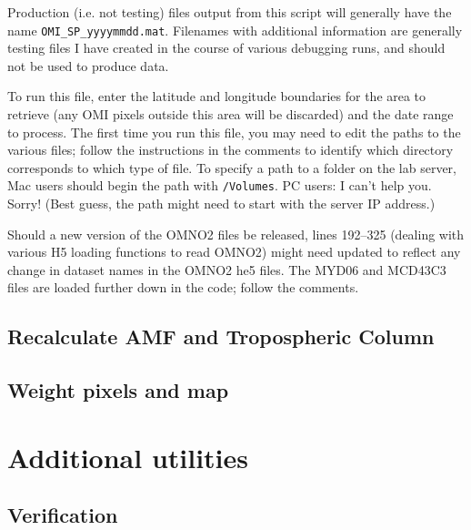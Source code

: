 \documentclass[12pt]{article}
\begin{document}
	Production (i.e. not testing) files output from this script will generally have the name {\lstinline[breaklines=true]|OMI_SP_yyyymmdd.mat|}.  Filenames with additional information are generally testing files I have created in the course of various debugging runs, and should not be used to produce  data.
	
	To run this file, enter the latitude and longitude boundaries for the area to retrieve (any OMI pixels outside this area will be discarded) and the date range to process.  The first time you run this file, you may need to edit the paths to the various files; follow the instructions in the comments to identify which directory corresponds to which type of file.  To specify a path to a folder on the lab server, Mac users should begin the path with {\lstinline[breaklines=true]|/Volumes|}.  PC users: I can't help you. Sorry! (Best guess, the path might need to start with the server IP address.)
	
	Should a new version of the OMNO2 files be released, lines 192--325 (dealing with various H5 loading functions to read OMNO2) might need updated to reflect any change in dataset names in the OMNO2 he5 files.  The MYD06 and MCD43C3 files are loaded further down in the code; follow the comments. 
	
	\subsection{Recalculate AMF and Tropospheric Column}
	\subsection{Weight pixels and map}
	

	
\section{Additional utilities}
	\subsection{Verification}
	
\end{document}
